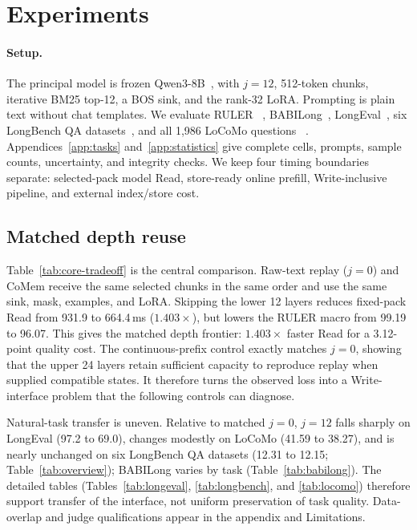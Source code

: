 \section{Experiments}
\label{sec:experiments}

\paragraph{Setup.}
The principal model is frozen Qwen3-8B~\citep{qwen3}, with $j{=}12$,
512-token chunks, iterative BM25 top-12, a BOS sink, and the rank-32 LoRA.
Prompting is plain text without chat templates. We evaluate RULER
~\citep{ruler}, BABILong~\citep{babilong}, LongEval~\citep{longchat}, six
LongBench QA datasets~\citep{longbench}, and all 1,986 LoCoMo questions
~\citep{locomo}. Appendices~\ref{app:tasks} and~\ref{app:statistics} give
complete cells, prompts, sample counts, uncertainty, and integrity checks. We keep four
timing boundaries separate: selected-pack model Read, store-ready online
prefill, Write-inclusive pipeline, and external index/store cost.

\subsection{Matched depth reuse}


Table~\ref{tab:core-tradeoff} is the central comparison. Raw-text replay
($j{=}0$) and CoMem receive the same selected chunks in the same order and use
the same sink, mask, examples, and LoRA. Skipping the lower 12 layers reduces
fixed-pack Read from 931.9 to 664.4\,ms ($1.403\times$), but lowers the RULER
macro from 99.19 to 96.07. This gives the matched depth frontier: $1.403\times$ faster Read for a
3.12-point quality cost. The continuous-prefix control exactly matches $j{=}0$,
showing that the upper 24 layers retain sufficient capacity to reproduce replay
when supplied compatible states. It therefore turns the observed loss into a
Write-interface problem that the following controls can diagnose.

Natural-task transfer is uneven. Relative to matched $j{=}0$, $j{=}12$
falls sharply on LongEval (97.2 to 69.0), changes modestly on LoCoMo (41.59 to
38.27), and is nearly unchanged on six LongBench QA datasets (12.31 to 12.15;
Table~\ref{tab:overview}); BABILong varies by task
(Table~\ref{tab:babilong}). The detailed tables
(Tables~\ref{tab:longeval}, \ref{tab:longbench}, and \ref{tab:locomo}) therefore
support transfer of the interface, not uniform preservation of task quality.
Data-overlap and judge qualifications appear in the appendix and Limitations.

